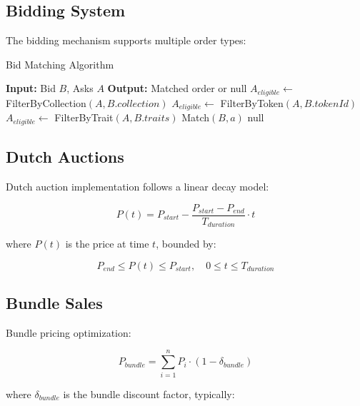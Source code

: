 \documentclass[11pt,a4paper]{article}
\begin{document}
\subsection{Bidding System}

The bidding mechanism supports multiple order types:

\begin{algorithm}
\caption{Bid Matching Algorithm}
\begin{algorithmic}
\STATE \textbf{Input:} Bid $B$, Asks $A$
\STATE \textbf{Output:} Matched order or null
\STATE
{}
    \STATE $A_{eligible} \leftarrow$ FilterByCollection$(A, B.collection)$
    \STATE $A_{eligible} \leftarrow$ FilterByToken$(A, B.tokenId)$
    \STATE $A_{eligible} \leftarrow$ FilterByTrait$(A, B.traits)$
\ENDIF
\STATE
{}
        \RETURN Match$(B, a)$
    \ENDIF
\ENDFOR
\RETURN null
\end{algorithmic}
\end{algorithm}

\subsection{Dutch Auctions}

Dutch auction implementation follows a linear decay model:

\begin{equation}
P(t) = P_{start} - \frac{P_{start} - P_{end}}{T_{duration}} \cdot t
\end{equation}

where $P(t)$ is the price at time $t$, bounded by:

\begin{equation}
P_{end} \leq P(t) \leq P_{start}, \quad 0 \leq t \leq T_{duration}
\end{equation}

\subsection{Bundle Sales}

Bundle pricing optimization:

\begin{equation}
P_{bundle} = \sum_{i=1}^{n} P_i \cdot (1 - \delta_{bundle})
\end{equation}

where $\delta_{bundle}$ is the bundle discount factor, typically:
\end{document}
